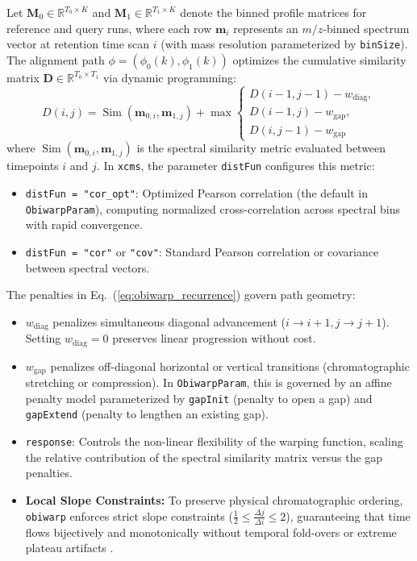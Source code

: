 \documentclass[11pt,twoside,openright]{book}
\begin{document}
Let $\mathbf{M}_0 \in \mathbb{R}^{T_0 \times K}$ and $\mathbf{M}_1 \in \mathbb{R}^{T_1 \times K}$ denote the binned profile matrices for reference and query runs, where each row $\mathbf{m}_i$ represents an $m/z$-binned spectrum vector at retention time scan $i$ (with mass resolution parameterized by \texttt{binSize}). The alignment path $\phi = (\phi_0(k), \phi_1(k))$ optimizes the cumulative similarity matrix $\mathbf{D} \in \mathbb{R}^{T_0 \times T_1}$ via dynamic programming:
\begin{equation}
\label{eq:obiwarp_recurrence}
D(i, j) = \operatorname{Sim}(\mathbf{m}_{0, i}, \mathbf{m}_{1, j}) + \max \begin{cases} 
D(i-1, j-1) - w_{\text{diag}}, \\ 
D(i-1, j) - w_{\text{gap}}, \\ 
D(i, j-1) - w_{\text{gap}} 
\end{cases}
\end{equation}
where $\operatorname{Sim}(\mathbf{m}_{0, i}, \mathbf{m}_{1, j})$ is the spectral similarity metric evaluated between timepoints $i$ and $j$. In \texttt{xcms}, the parameter \texttt{distFun} configures this metric:
\begin{itemize}
    \item \texttt{distFun = "cor\_opt"}: Optimized Pearson correlation (the default in \texttt{ObiwarpParam}), computing normalized cross-correlation across spectral bins with rapid convergence.
    \item \texttt{distFun = "cor"} or \texttt{"cov"}: Standard Pearson correlation or covariance between spectral vectors.
\end{itemize}
The penalties in Eq.~(\ref{eq:obiwarp_recurrence}) govern path geometry:
\begin{itemize}
    \item $w_{\text{diag}}$ penalizes simultaneous diagonal advancement ($i \to i+1, j \to j+1$). Setting $w_{\text{diag}} = 0$ preserves linear progression without cost.
    \item $w_{\text{gap}}$ penalizes off-diagonal horizontal or vertical transitions (chromatographic stretching or compression). In \texttt{ObiwarpParam}, this is governed by an affine penalty model parameterized by \texttt{gapInit} (penalty to open a gap) and \texttt{gapExtend} (penalty to lengthen an existing gap).
    \item \texttt{response}: Controls the non-linear flexibility of the warping function, scaling the relative contribution of the spectral similarity matrix versus the gap penalties.
    \item \textbf{Local Slope Constraints:} To preserve physical chromatographic ordering, \texttt{obiwarp} enforces strict slope constraints ($\frac{1}{2} \le \frac{\Delta j}{\Delta i} \le 2$), guaranteeing that time flows bijectively and monotonically without temporal fold-overs or extreme plateau artifacts \cite{prince2006chromatographic}.
\end{itemize}
\end{document}

